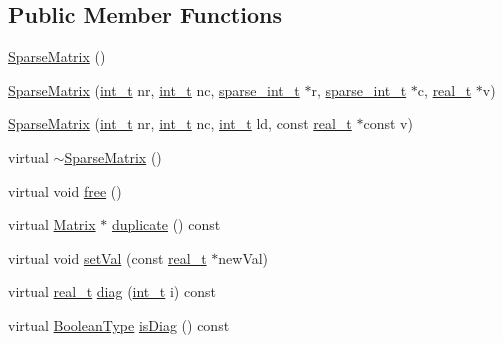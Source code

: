 \subsection*{Public Member Functions}
\begin{DoxyCompactItemize}
\item 
\hyperlink{class_sparse_matrix_ac010252479e500b34324cb10c9dd4e98}{Sparse\+Matrix} ()
\item 
\hyperlink{class_sparse_matrix_a217f2c93982407f7b8b81c189be329bd}{Sparse\+Matrix} (\hyperlink{_types_8hpp_ab6fd6105e64ed14a0c9281326f05e623}{int\+\_\+t} nr, \hyperlink{_types_8hpp_ab6fd6105e64ed14a0c9281326f05e623}{int\+\_\+t} nc, \hyperlink{_types_8hpp_aa5432b00c9081e2d62d7f38c32e4ed80}{sparse\+\_\+int\+\_\+t} $\ast$r, \hyperlink{_types_8hpp_aa5432b00c9081e2d62d7f38c32e4ed80}{sparse\+\_\+int\+\_\+t} $\ast$c, \hyperlink{qp_o_a_s_e_s__wrapper_8h_a0d00e2b3dfadee81331bbb39068570c4}{real\+\_\+t} $\ast$v)
\item 
\hyperlink{class_sparse_matrix_a0314dc0fa81c0cbedda7e8974dec3b80}{Sparse\+Matrix} (\hyperlink{_types_8hpp_ab6fd6105e64ed14a0c9281326f05e623}{int\+\_\+t} nr, \hyperlink{_types_8hpp_ab6fd6105e64ed14a0c9281326f05e623}{int\+\_\+t} nc, \hyperlink{_types_8hpp_ab6fd6105e64ed14a0c9281326f05e623}{int\+\_\+t} ld, const \hyperlink{qp_o_a_s_e_s__wrapper_8h_a0d00e2b3dfadee81331bbb39068570c4}{real\+\_\+t} $\ast$const v)
\item 
virtual \hyperlink{class_sparse_matrix_a5d93890df585cae1602c07b2cbcce923}{$\sim$\+Sparse\+Matrix} ()
\item 
virtual void \hyperlink{class_sparse_matrix_a79d5aeb24f1b1184b9fb798144999ea2}{free} ()
\item 
virtual \hyperlink{class_matrix}{Matrix} $\ast$ \hyperlink{class_sparse_matrix_a6bc56359292e4a3e97ecbca4c8f3d3c6}{duplicate} () const
\item 
virtual void \hyperlink{class_sparse_matrix_a0b1ea9f7a3b65c583244d94acb9ea658}{set\+Val} (const \hyperlink{qp_o_a_s_e_s__wrapper_8h_a0d00e2b3dfadee81331bbb39068570c4}{real\+\_\+t} $\ast$new\+Val)
\item 
virtual \hyperlink{qp_o_a_s_e_s__wrapper_8h_a0d00e2b3dfadee81331bbb39068570c4}{real\+\_\+t} \hyperlink{class_sparse_matrix_a0a85fc812509525708eae5d94fd5dcb8}{diag} (\hyperlink{_types_8hpp_ab6fd6105e64ed14a0c9281326f05e623}{int\+\_\+t} i) const
\item 
virtual \hyperlink{_types_8hpp_a20f82124c82b6f5686a7fce454ef9089}{Boolean\+Type} \hyperlink{class_sparse_matrix_ae6ef806471b9e75b70277365b09346f0}{is\+Diag} () const

\end{DoxyCompactItemize}
